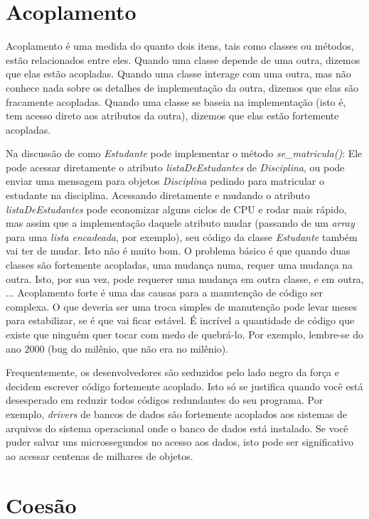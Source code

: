 \section{Acoplamento}

Acoplamento é uma medida do quanto dois itens, tais como classes ou métodos, estão relacionados entre eles. Quando uma classe depende de uma outra, dizemos que elas estão acopladas. Quando uma classe interage com uma outra, mas não conhece nada sobre os detalhes de implementação da outra, dizemos que elas são fracamente acopladas. Quando uma classe se baseia na implementação (isto é, tem acesso direto aos atributos da outra), dizemos que elas estão fortemente acopladas.

Na discussão de como \emph{Estudante} pode implementar o método \emph{se\_matricula()}: Ele pode acessar diretamente o atributo \emph{listaDeEstudantes} de \emph{Disciplina}, ou pode enviar uma mensagem para objetos \emph{Disciplina} pedindo para matricular o estudante na disciplina. Acessando diretamente e mudando o atributo \emph{listaDeEstudantes} pode economizar alguns ciclos de CPU e rodar mais rápido, mas assim que a implementação daquele atributo mudar (passando de um \textit{array} para uma \textit{lista encadeada}, por exemplo), seu código da classe \emph{Estudante} também vai ter de mudar. Isto não é muito bom. O problema básico é que quando duas classes são fortemente acopladas, uma mudança numa, requer uma mudança na outra. Isto, por sua vez, pode requerer uma mudança em outra classe, e em outra, ... Acoplamento forte é uma das causas para a manutenção de código ser complexa. O que deveria ser uma troca simples de manutenção pode levar meses para estabilizar, se é que vai ficar estável. É incrível a quantidade de código que existe que ninguém quer tocar com medo de quebrá-lo. Por exemplo, lembre-se do ano 2000 (bug do milênio, que não era no milênio).

Frequentemente, os desenvolvedores são seduzidos pelo lado negro da força e decidem escrever código fortemente acoplado. Isto só se justifica quando você está desesperado em reduzir todos códigos redundantes do seu programa. Por exemplo, \textit{drivers} de bancos de dados são fortemente acoplados aos sistemas de arquivos do sistema operacional onde o banco de dados está instalado. Se você puder salvar uns microssegundos no acesso aos dados, isto pode ser significativo ao acessar centenas de milhares de objetos.

\section{Coesão}

